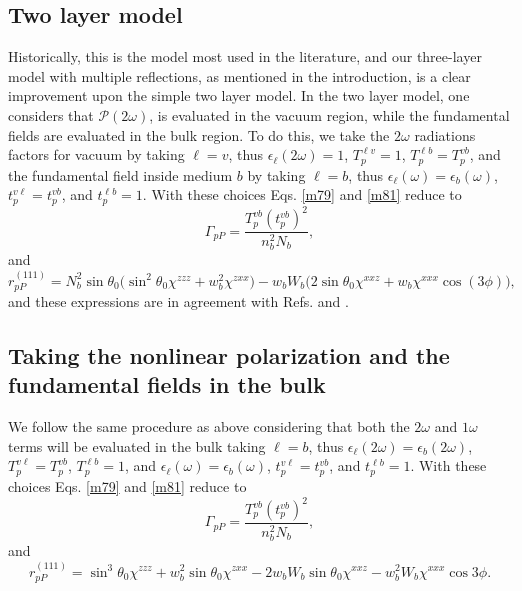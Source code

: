

\subsection{Two layer model}\label{sec:2layer}

Historically, this is the model most used in the literature, and our three-layer model with multiple reflections, as mentioned in the introduction, is a clear improvement upon the simple two layer model. In the two layer model, one considers that $\boldsymbol{\mathcal{P}}(2\omega)$, is evaluated in the vacuum region, while the fundamental fields are evaluated in the bulk region.\cite{sipePRB87, mizrahiJOSA88} To do this, we take the $2\omega$ radiations factors for vacuum by taking $\ell=v$, thus $\epsilon_{\ell}(2\omega)=1$, $T^{\ell v}_{p}=1$, $T^{\ell b}_{p} = T^{vb}_{p}$, and the fundamental field inside medium $b$ by taking $\ell=b$, thus $\epsilon_{\ell}(\omega)=\epsilon_{b}(\omega)$, $t^{v\ell}_{p}=t^{vb}_{p}$, and $t^{\ell b}_{p}=1$. With these choices Eqs. \eqref{m79} and \eqref{m81} reduce to
\begin{equation}\label{m78}
\Gamma_{pP}
= \frac{T^{v b}_{p}(t^{vb}_{p})^2}
       {n^{2}_{b}N_{b}}, 
\end{equation}
and
\begin{equation}\label{m82}
r^{(111)}_{pP} =
N^{2}_{b}\sin\theta_{0}
\Big(
\sin^{2}\theta_{0}\chi^{zzz} + w^{2}_{b}\chi^{zxx}
\Big)
- w_{b}W_{b}
\Big(
2\sin\theta_{0}\chi^{xxz} + w_{b}\chi^{xxx}\cos(3\phi)
\Big),
\end{equation}
and these expressions are in agreement with Refs. \cite{sipePRB87} and
\cite{mizrahiJOSA88}.



\subsection{Taking the nonlinear polarization and the fundamental fields in the
bulk}\label{sec:bulk}

We follow the same procedure as above considering that both the $2\omega$ and $1\omega$ terms will be evaluated in the bulk taking $\ell = b$, thus $\epsilon_{\ell}(2\omega)=\epsilon_{b}(2\omega)$, $T^{v\ell}_{p}=T^{vb}_{p}$, $T^{\ell b}_{p} = 1$, and $\epsilon_{\ell}(\omega)=\epsilon_{b}(\omega)$, $t^{v\ell}_{p} = t^{vb}_{p}$, and $t^{\ell b}_{p} = 1$. With these choices Eqs. \eqref{m79} and \eqref{m81} reduce to
\begin{equation}
\Gamma_{pP} =
\frac{T_{p}^{vb}\left(t^{vb}_{p}\right)^{2}}
     {n^{2}_{b}N_{b}}, 
\end{equation}
and
\begin{equation}
r^{(111)}_{pP} =
  \sin^{3}\theta_{0}\chi^{zzz}
 + w^{2}_{b}\sin\theta_{0}\chi^{zxx} 
 - 2w_{b}W_{b}\sin\theta_{0}\chi^{xxz}
 - w^{2}_{b}W_{b}\chi^{xxx}\cos3\phi.
\end{equation}



